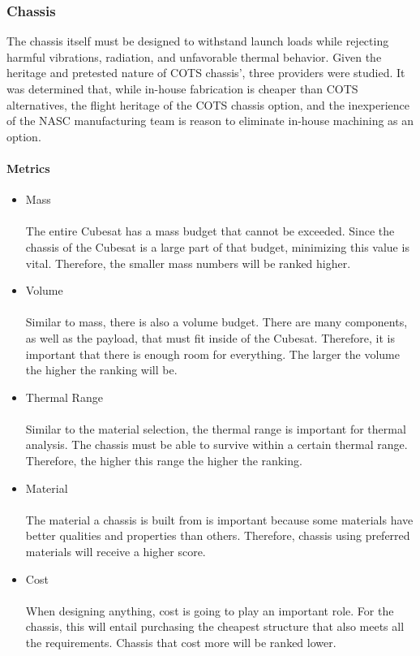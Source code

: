 \subsubsection{Chassis}
The chassis itself must be designed to withstand launch loads while rejecting harmful vibrations, radiation, and unfavorable thermal behavior. Given the heritage and pretested nature of COTS chassis', three providers were studied. It was determined that, while in-house fabrication is cheaper than COTS alternatives, the flight heritage of the COTS chassis option, and the inexperience of the NASC manufacturing team is reason to eliminate in-house machining as an option. 
\paragraph{Metrics}
\begin{itemize}
\item{Mass}\\
\\
The entire Cubesat has a mass budget that cannot be exceeded. Since the chassis of the Cubesat is a large part of that budget, minimizing this value is vital. Therefore, the smaller mass numbers will be ranked higher. 
\\
\item{Volume}\\
\\
Similar to mass, there is also a volume budget. There are many components, as well as the payload, that must fit inside of the Cubesat. Therefore, it is important that there is enough room for everything. The larger the volume the higher the ranking will be.
\\
\item{Thermal Range}\\
\\
Similar to the material selection, the thermal range is important for thermal analysis. The chassis must be able to survive within a certain thermal range. Therefore, the higher this range the higher the ranking.
\\
\item{Material}\\
\\
The material a chassis is built from is important because some materials have better qualities and properties than others. Therefore, chassis using preferred materials will receive a higher score. 
\\
\item{Cost}\\
\\
When designing anything, cost is going to play an important role. For the chassis, this will entail purchasing the cheapest structure that also meets all the requirements. Chassis that cost more will be ranked lower.
\end{itemize}

